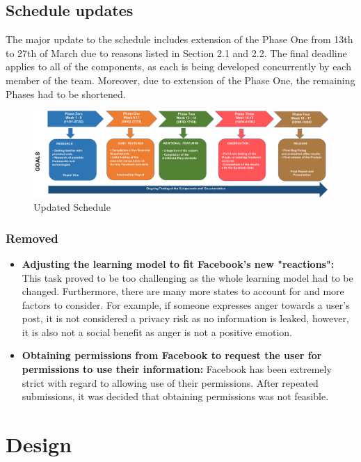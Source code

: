\documentclass[a4paper,11pt]{article}
\begin{document}
\subsection {Schedule updates}
The major update to the schedule includes extension of the Phase One from 13th to 27th of March due to reasons listed in Section 2.1 and 2.2. The final deadline applies to all of the components, as each  is being developed concurrently by each member of the team. Moreover, due to extension of the Phase One, the remaining Phases had to be shortened.

\begin{figure}[H]
	\hspace*{-0.26in}
	\includegraphics[scale=0.15]{Schedule}
	\caption{Updated Schedule}
\end{figure}

\subsubsection{Removed}

\begin{itemize}

\item \textbf{Adjusting the learning model to fit Facebook's new "reactions":} This task proved to be too challenging as the whole learning model had to be changed. Furthermore, there are many more states to account for and more factors to consider. For example, if someone expresses anger towards a user's post, it is not considered a privacy risk as no information is leaked, however, it is also not a social benefit as anger is not a positive emotion. 

\item \textbf{Obtaining permissions from Facebook to request the user for permissions to use their information:} Facebook has been extremely strict with regard to allowing use of their permissions. After repeated submissions, it was decided that obtaining permissions was not feasible.

\end{itemize}


\section{Design}
\end{document}
